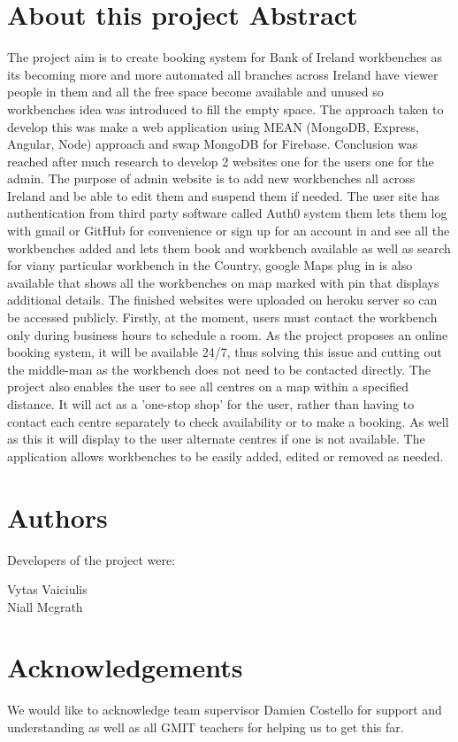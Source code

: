 \chapter*{About this project Abstract}

\bigbreak
The project aim is to create booking system for Bank of Ireland workbenches as its becoming more and more automated all branches across Ireland have viewer people in them and all the free space become available and unused so workbenches idea was introduced to fill the empty space. The approach taken to develop this was make a web application using MEAN (MongoDB, Express, Angular, Node) approach
and swap MongoDB for Firebase. Conclusion was reached after much research to develop 2 websites one for the users one for the admin. The purpose of admin website is to add new workbenches all across Ireland and be able to edit them and suspend them if needed. The user site has authentication from third party software called Auth0 system them lets them log with gmail or GitHub for convenience or sign up for an account in and see all the workbenches added and lets them book and workbench available as well as search for viany particular workbench in the Country, google Maps plug in is also available that shows all the workbenches on map marked with pin that displays additional details. The finished websites were uploaded on heroku server so can be accessed publicly.
Firstly, at the moment, users must contact the workbench only during business hours to schedule a room. As the project proposes an online booking system, it will be available 24/7, thus solving this issue and cutting out the middle-man as the workbench does not need to be contacted directly.
The project also enables the user to see all centres on a map within a specified distance. It will act as a 'one-stop shop' for the user, rather than having to contact each centre separately to check availability or to make a booking. As well as this it will display to the user alternate centres if one is not available. The application allows workbenches to be easily added, edited or removed as needed.


\chapter*{Authors}
Developers of the project were:
\bigbreak

Vytas Vaiciulis 
\\Niall Mcgrath 
\pagebreak

\chapter*{Acknowledgements}
We would like to acknowledge team supervisor Damien Costello for support and understanding as well as all GMIT teachers for helping us to get this far.
\pagebreak


